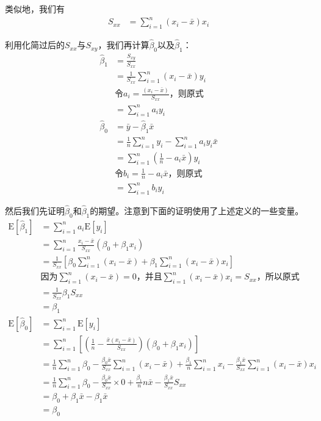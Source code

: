 \documentclass[UTF8]{ctexbook}
\begin{document}
类似地，我们有
\begin{align*}
	S_{xx}&=\sum_{i=1}^n(x_i-\bar x)x_i
\end{align*}

利用化简过后的$S_{xx}$与$S_{xy}$，我们再计算$\hat\beta_0$以及$\hat\beta_1$：
\begin{align*}
	\hat\beta_1&=\frac{S_{xy}}{S_{xx}}\\
	&=\frac{1}{S_{xx}}\sum_{i=1}^n(x_i-\bar x)y_i\\
	&\text{令$a_i=\frac{(x_i-\bar x)}{S_{xx}}$，则原式}\\
	&=\sum_{i=1}^na_iy_i\\
	\hat\beta_0&=\bar y-\hat\beta_1\bar x\\
	&=\frac{1}{n}\sum_{i=1}^ny_i-\sum_{i=1}^na_iy_i\bar x\\
	&=\sum_{i=1}^n(\frac{1}{n}-a_i\bar x)y_i\\
	&\text{令$b_i=\frac{1}{n}-a_i\bar x$，则原式}\\
	&=\sum_{i=1}^nb_iy_i
\end{align*}

然后我们先证明$\hat\beta_0$和$\hat\beta_1$的期望。注意到下面的证明使用了上述定义的一些变量。
\begin{align*}
	\mathrm E[\hat\beta_1]&=\sum_{i=1}^na_i\mathrm E[y_i]\\
	&=\sum_{i=1}^n\frac{x_i-\bar x}{S_{xx}}(\beta_0+\beta_1x_i)\\
	&=\frac{1}{S_{xx}}[\beta_0\sum_{i=1}^n(x_i-\bar x)+\beta_1\sum_{i=1}^n(x_i-\bar x)x_i]\\
	&\text{因为$\sum_{i=1}^n(x_i-\bar x)=0$，并且$\sum_{i=1}^n(x_i-\bar x)x_i=S_{xx}$，所以原式}\\
	&=\frac{1}{S_{xx}}\beta_1S_{xx}\\
	&=\beta_1\\
	\mathrm E[\hat\beta_0]&=\sum_{i=1}^n\mathrm E[y_i]\\
	&=\sum_{i=1}^n\left[\left(\frac{1}{n}-\frac{\bar x(x_i-\bar x)}{S_{xx}}\right)(\beta_0+\beta_1x_i)\right]\\
	&=\frac{1}{n}\sum_{i=1}^n\beta_0-\frac{\beta_0\bar x}{S_{xx}}\sum_{i=1}^n(x_i-\bar x)+\frac{\beta_1}{n}\sum_{i=1}^nx_i-\frac{\beta_1\bar x}{S_{xx}}\sum_{i=1}^n(x_i-\bar x)x_i\\
	&=\frac{1}{n}\sum_{i=1}^n\beta_0-\frac{\beta_0\bar x}{S_{xx}}\times 0+\frac{\beta_1}{n}n\bar x-\frac{\beta_1\bar x}{S_{xx}}S_{xx}\\
	&=\beta_0+\beta_1\bar x-\beta_1\bar x\\
	&=\beta_0
\end{align*}
\end{document}
